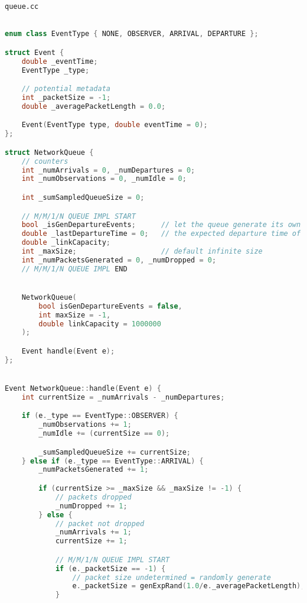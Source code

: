\documentclass{article}
\begin{document}
\texttt{queue.cc}
\begin{lstlisting}[language=C++,
                   directivestyle={\color{black}}
                   emph={int,char,double,float,unsigned},
                   emphstyle={\color{blue}}
                  ]

enum class EventType { NONE, OBSERVER, ARRIVAL, DEPARTURE };

struct Event {
    double _eventTime;
    EventType _type;

    // potential metadata
    int _packetSize = -1;
    double _averagePacketLength = 0.0;

    Event(EventType type, double eventTime = 0);
};

struct NetworkQueue {
    // counters
    int _numArrivals = 0, _numDepartures = 0;
    int _numObservations = 0, _numIdle = 0;

    int _sumSampledQueueSize = 0;

    // M/M/1/N QUEUE IMPL START
    bool _isGenDepartureEvents;      // let the queue generate its own departure events
    double _lastDepartureTime = 0;   // the expected departure time of the last packet in q
    double _linkCapacity;
    int _maxSize;                    // default infinite size
    int _numPacketsGenerated = 0, _numDropped = 0;
    // M/M/1/N QUEUE IMPL END


    NetworkQueue(
        bool isGenDepartureEvents = false,
        int maxSize = -1,
        double linkCapacity = 1000000
    );

    Event handle(Event e);
};


Event NetworkQueue::handle(Event e) {
    int currentSize = _numArrivals - _numDepartures;

    if (e._type == EventType::OBSERVER) {
        _numObservations += 1;
        _numIdle += (currentSize == 0);

        _sumSampledQueueSize += currentSize;
    } else if (e._type == EventType::ARRIVAL) {
        _numPacketsGenerated += 1;

        if (currentSize >= _maxSize && _maxSize != -1) {
            // packets dropped
            _numDropped += 1;
        } else {
            // packet not dropped
            _numArrivals += 1;
            currentSize += 1;

            // M/M/1/N QUEUE IMPL START
            if (e._packetSize == -1) {
                // packet size undetermined = randomly generate
                e._packetSize = genExpRand(1.0/e._averagePacketLength);
            }


\end{lstlisting}
\end{document}
